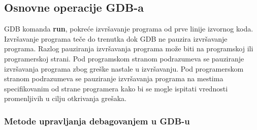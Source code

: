 \documentclass[a4paper]{article}
\begin{document}
\subsection{Osnovne operacije GDB-a}
\label{subsec:debager_operacije}

GDB komanda \textbf{run}, pokreće izvršavanje programa od prve linije izvornog koda.
Izvršavanje programa teče do trenutka dok GDB ne pauzira izvršavanje programa. 
Razlog pauziranja izvršavanja programa može biti na programskoj ili programerskoj strani.
Pod programskom stranom podrazumeva se pauziranje izvršavanja programa zbog greške 
nastale u izvršavanju. Pod programerskom stranom podrazumeva se pauziranje izvršavanja 
programa na mestima specifikovanim od strane programera kako bi se mogle ispitati 
vrednosti promenljivih u cilju otkrivanja grešaka.

\subsubsection{Metode upravljanja debagovanjem u GDB-u}
\label{subsec:gdb_metode}
\end{document}
